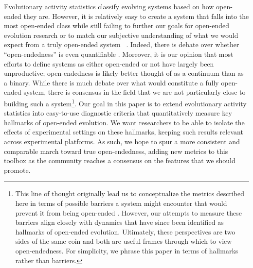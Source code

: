 \documentclass[letterpaper]{article}
\begin{document}
Evolutionary activity statistics classify evolving systems based on how open-ended they are. However, it is relatively easy to create a system that falls into the most open-ended class while still failing to further our goals for open-ended evolution research or to match our subjective understanding of what we would expect from a truly open-ended system ~\cite{maley_four_1999}. Indeed, there is debate over whether ``open-endedness'' is even quantifiable \citep{stanley_role_2016}. Moreover, it is our opinion that most efforts to define systems as either open-ended or not have largely been unproductive; open-endedness is likely better thought of as a continuum than as a binary. While there is much debate over what would constitute a fully open-ended system, there is consensus in the field that we are not particularly close to building such a system\footnote{This line of thought originally lead us to conceptualize the metrics described here in terms of possible barriers a system might encounter that would prevent it from being open-ended \citep{blogpost}. However, our attempts to measure these barriers align closely with dynamics that have since been identified as hallmarks of open-ended evolution. Ultimately, these perspectives are two sides of the same coin and both are useful frames through which to view open-endedness. For simplicity, we phrase this paper in terms of hallmarks rather than barriers.}. 
Our goal in this paper is to extend evolutionary activity statistics into easy-to-use diagnostic criteria that quantitatively measure key hallmarks of open-ended evolution.  We want researchers to be able to isolate the effects of experimental settings on these hallmarks, keeping such results relevant across experimental platforms. As such, we hope to spur a more consistent and comparable march toward true open-endedness, adding new metrics to this toolbox as the community reaches a consensus on the features that we should promote.

\end{document}
